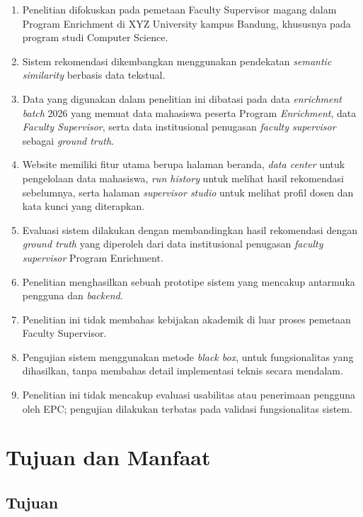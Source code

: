 \begin{enumerate}
\def\labelenumi{\arabic{enumi}.}
\item
  Penelitian difokuskan pada pemetaan Faculty Supervisor magang dalam Program Enrichment di XYZ University kampus Bandung, khususnya pada program studi Computer Science.
\item
  Sistem rekomendasi dikembangkan menggunakan pendekatan \textit{semantic similarity} berbasis data tekstual.
\item 
  Data yang digunakan dalam penelitian ini dibatasi pada data \textit{enrichment} \textit{batch} 2026 yang memuat data mahasiswa peserta Program \textit{Enrichment}, data \textit{Faculty Supervisor}, serta data institusional penugasan \textit{faculty supervisor} sebagai \textit{ground truth}.
\item 
  Website memiliki fitur utama berupa halaman beranda, \textit{data center} untuk pengelolaan data mahasiswa, \textit{run history} untuk melihat hasil rekomendasi sebelumnya, serta halaman \textit{supervisor studio} untuk melihat profil dosen dan kata kunci yang diterapkan.
\item
  Evaluasi sistem dilakukan dengan membandingkan hasil rekomendasi dengan \textit{ground truth} yang diperoleh dari data institusional penugasan \textit{faculty supervisor} Program Enrichment.
\item
  Penelitian menghasilkan sebuah prototipe sistem yang mencakup antarmuka pengguna dan \textit{backend}.
\item
  Penelitian ini tidak membahas kebijakan akademik di luar proses pemetaan Faculty Supervisor.
\item 
  Pengujian sistem menggunakan metode \textit{black box}, untuk fungsionalitas yang dihasilkan, tanpa membahas detail implementasi teknis secara mendalam.
\item
  Penelitian ini tidak mencakup evaluasi usabilitas atau penerimaan pengguna oleh EPC; pengujian dilakukan terbatas pada validasi fungsionalitas sistem.

\end{enumerate}
\section{Tujuan dan Manfaat}\label{tujuan-dan-manfaat}

\subsection{Tujuan}\label{tujuan}


